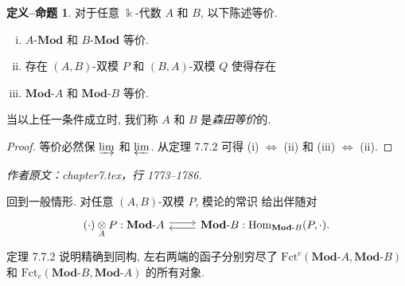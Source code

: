 \documentclass[11pt]{article}
\newcommand{\Hom}{\operatorname{Hom}}
\newcommand{\cated}[1]{\mathbf{#1}\text{-}}
\newcommand{\dcate}[1]{\text{-}\mathbf{#1}}
\newcommand{\dotimes}[1]{\mathbin{\mathop{\otimes}\limits_{#1}}}
\renewcommand{\index}[2][]{\relax}
\theoremstyle{definition}
\newtheorem{definition-proposition}[theorem]{定义--命题}
\begin{document}
\begin{definition-proposition}\label{def:Morita-equiv}
	\index{sentiandengjia@森田等价 (Morita equivalence)}
	对于任意 $\Bbbk$-代数 $A$ 和 $B$, 以下陈述等价.
	\begin{enumerate}[(i)]
		\item $A\dcate{Mod}$ 和 $B\dcate{Mod}$ 等价.
		\item 存在 $(A, B)$-双模 $P$ 和 $(B, A)$-双模 $Q$ 使得存在
		\item $\cated{Mod}A$ 和 $\cated{Mod}B$ 等价.
	\end{enumerate}
	当以上任一条件成立时, 我们称 $A$ 和 $B$ 是\emph{森田等价}的.
\end{definition-proposition}
\begin{proof}
	等价必然保 $\varinjlim$ 和 $\varprojlim$. 从定理 7.7.2 可得 (i) $\iff$ (ii) 和 (iii) $\iff$ (ii).
\end{proof}
\par\medskip\noindent\textit{作者原文：chapter7.tex，行 1773--1786.}\par
\begingroup\small
回到一般情形. 对任意 $(A, B)$-双模 $P$, 模论的常识 \cite[定理 6.6.5]{Li1} 给出伴随对
\renewcommand{\theequation}{7.7.2}
\begin{equation}\label{eqn:AB-adjunction}\begin{tikzcd}
	(\cdot) \dotimes{A} P : \cated{Mod}A \arrow[shift left, r] & \cated{Mod}B: \Hom_{\cated{Mod}B}(P, \cdot). \arrow[shift left, l]
\end{tikzcd}\end{equation}
定理 7.7.2 说明精确到同构, 左右两端的函子分别穷尽了 $\mathrm{Fct}^c(\cated{Mod}A, \cated{Mod}B)$ 和 $\mathrm{Fct}_c(\cated{Mod}B, \cated{Mod}A)$ 的所有对象.
\end{document}
